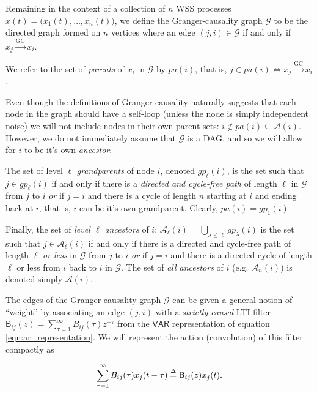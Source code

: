 \documentclass[12pt]{article}
\def\gc{\overset{\text{GC}}{\rightarrow}}  %
\def\gcg{\mathcal{G}}  %
\def\VAR{\mathsf{VAR}}  %
\def\B{\mathsf{B}}  %
\newcommand{\pa}[1]{pa(#1)}  %
\newcommand{\anc}[1]{\mathcal{A}(#1)}  %
\newcommand{\ancn}[2]{\mathcal{A}_{#1}(#2)}  %
\newcommand{\gpn}[2]{gp_{#1}(#2)}  # nth generation grandparents
\begin{document}
\begin{definition}

Remaining in the context of a collection of $n$ WSS processes
$x(t) = \big(x_1(t), \ldots, x_n(t)\big)$, we define the Granger-causality
graph $\gcg$ to be the directed graph formed on $n$ vertices where an
edge $(j, i) \in \gcg$ if and only if $x_j \gc x_i$.

We refer to the set of \textit{parents} of $x_i$ in $\gcg$ by
$\pa{i}$, that is, $j \in \pa{i} \iff x_j \gc x_i$.

Even though the definitions of Granger-causality naturally suggests
that each node in the graph should have a self-loop (unless the node
is simply independent noise) we will not include nodes in their own
parent sets: $i \not\in \pa{i} \subseteq \anc{i}$.  However, we do not
immediately assume that $\gcg$ is a DAG, and so we will allow for $i$
to be it's own \textit{ancestor}.

The set of level $\ell$ \textit{grandparents} of node $i$, denoted
$\gpn{\ell}{i}$, is the set such that $j \in \gpn{\ell}{i}$ if and only if
there is a \textit{directed and cycle-free path} of length $\ell$ in
$\gcg$ from $j$ to $i$ \textit{or} if $j = i$ and there is a cycle of
length $n$ starting at $i$ and ending back at $i$, that is, $i$ can be
it's own grandparent.  Clearly, $\pa{i} = \gpn{1}{i}$.

Finally, the set of \textit{level $\ell$ ancestors} of
$i$: $\ancn{\ell}{i} = \bigcup_{\lambda \le \ell}\gpn{\lambda}{i}$ is the set such that
$j \in \ancn{\ell}{i}$ if and only if there is a directed and cycle-free
path of length $\ell$ \textit{or less} in $\gcg$ from $j$ to $i$
\textit{or} if $j = i$ and there is a directed cycle of length $\ell$ or
less from $i$ back to $i$ in $\gcg$.  The set of \textit{all
  ancestors} of $i$ (e.g. $\ancn{n}{i}$) is denoted simply $\anc{i}$.
\end{definition}

The edges of the Granger-causality graph $\gcg$ can be given a general
notion of ``weight'' by associating an edge $(j, i)$ with a
\textit{strictly causal} LTI filter
$\B_{ij}(z) = \sum_{\tau = 1}^{\infty} B_{ij}(\tau)z^{-\tau}$ from the
$\VAR$ representation of equation \ref{eqn:ar_representation}.  We
will represent the action (convolution) of this filter compactly as

\begin{equation}
  \sum_{\tau = 1}^\infty B_{ij}(\tau)x_j(t - \tau) \defeq \B_{ij}(z)x_j(t).
\end{equation}
\end{document}
